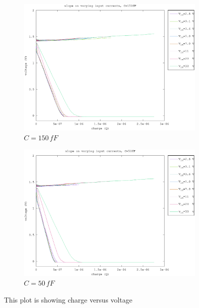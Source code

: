 \documentclass{article}
\begin{document}
\begin{figure}[h]
\begin{subfigure}[b]{0.475\textwidth}
	    \centering 
	    \includegraphics[width=\textwidth]{fig/charge_150fF.eps}
	    \caption[]%
	    {$C=150\,fF$}    
	    \label{fig:charges_150fF}
	\end{subfigure}
	\quad
	\begin{subfigure}[b]{0.475\textwidth}   
	    \centering 
	    \includegraphics[width=\textwidth]{fig/charge_50fF.eps}
	    \caption[]%
	    {$C=50\,fF$}    
	    \label{fig:charges_50fF}
	\end{subfigure}
	\caption{This plot is showing charge versus voltage}
	\label{fig:charges}
\end{figure}
\end{document}

